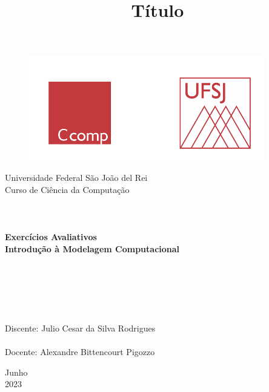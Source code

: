 \documentclass[a4paper, 12pt]{article}
\begin{document}

\begin{titlepage}
	\begin{center}
	
	\begin{figure}[ht]
    \centering
    \includegraphics[width=.44\textwidth]{Images/LogoUFSJ.PNG}
    \label{fig:Capturar.PNG}
    \end{figure}

    	\Huge{Universidade Federal São João del Rei}\\
		\Large{Curso de Ciência da Computação}\\ 

        \vspace{110pt}
        \textbf{\LARGE{
        \\
        \\
        \\
        Exercícios Avaliativos\\
        \vspace{0.5cm}
        \Large{Introdução à Modelagem Computacional}
        \\
        \\
        \\
        }}
        
		\title{{\large{Título}}}
		\vspace{2.5cm}
	\end{center}
	    
    \begin{flushleft}
		\begin{tabbing}
		\\
		\\
		\\	
		\large{Discente: Julio Cesar da Silva Rodrigues}\\
	    \\
		\large{Docente: Alexandre Bittencourt Pigozzo}\\
	    \end{tabbing}
    \end{flushleft}
	\vspace{1cm}
	
	\begin{center}
		\vspace{\fill}
			Junho\\
		    2023
	\end{center}
\end{titlepage}
\end{document}
